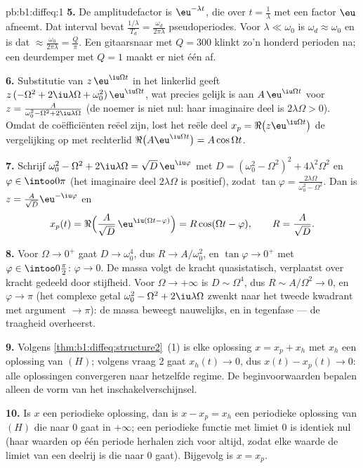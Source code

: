 \begin{solution}{pb:b1:diffeq:1}
\textbf{5.} De amplitudefactor is $\eu^{-\lambda t}$, die over $t =
\frac1\lambda$ met een factor $\eu$ afneemt. Dat interval bevat
$\frac{1/\lambda}{T_d} = \frac{\omega_d}{2\pi\lambda}$ pseudoperiodes.
Voor $\lambda \ll \omega_0$ is $\omega_d \approx \omega_0$ en is dat
$\approx \frac{\omega_0}{2\pi\lambda} = \frac Q\pi$. Een gitaarsnaar met
$Q = 300$ klinkt zo'n honderd perioden na; een deurdemper met $Q = 1$
maakt er niet één af.

\textbf{6.} Substitutie van $z\,\eu^{\iu\Omega t}$ in het linkerlid geeft
$z\,(-\Omega^2 + 2\iu\lambda\Omega + \omega_0^2)\,\eu^{\iu\Omega t}$, wat
precies gelijk is aan $A\,\eu^{\iu\Omega t}$ voor $z =
\frac{A}{\omega_0^2 - \Omega^2 + 2\iu\lambda\Omega}$ (de noemer is niet
nul: haar imaginaire deel is $2\lambda\Omega > 0$). Omdat de
coëfficiënten reëel zijn, lost het reële deel $x_p =
\Re\bigl(z\eu^{\iu\Omega t}\bigr)$ de vergelijking op met rechterlid
$\Re\bigl(A\eu^{\iu\Omega t}\bigr) = A\cos\Omega t$.

\textbf{7.} Schrijf $\omega_0^2 - \Omega^2 + 2\iu\lambda\Omega =
\sqrt{D}\,\eu^{\iu\varphi}$ met $D = (\omega_0^2 - \Omega^2)^2 +
4\lambda^2\Omega^2$ en $\varphi \in \intoo0\pi$ (het imaginaire deel
$2\lambda\Omega$ is positief), zodat $\tan\varphi =
\frac{2\lambda\Omega}{\omega_0^2 - \Omega^2}$. Dan is $z = \frac{A}{\sqrt
D}\eu^{-\iu\varphi}$ en
\[
x_p(t) = \Re\Bigl(\frac A{\sqrt D}\,\eu^{\iu(\Omega t -
\varphi)}\Bigr) = R\cos(\Omega t - \varphi),
\qquad R = \frac A{\sqrt D} .
\]

\textbf{8.} Voor $\Omega \to 0^+$ gaat $D \to \omega_0^4$, dus $R \to
A/\omega_0^2$, en $\tan\varphi \to 0^+$ met $\varphi \in
\intoo0{\frac\pi2}$: $\varphi \to 0$. De massa volgt de kracht
quasistatisch, verplaatst over kracht gedeeld door stijfheid. Voor
$\Omega \to +\infty$ is $D \sim \Omega^4$, dus $R \sim A/\Omega^2 \to 0$,
en $\varphi \to \pi$ (het complexe getal $\omega_0^2 - \Omega^2 +
2\iu\lambda\Omega$ zwenkt naar het tweede kwadrant met argument $\to
\pi$): de massa beweegt nauwelijks, en in tegenfase --- de traagheid
overheerst.

\textbf{9.} Volgens \cref{thm:b1:diffeq:structure2}~(1) is elke oplossing
$x = x_p + x_h$ met $x_h$ een oplossing van $(H)$; volgens vraag 2 gaat
$x_h(t) \to 0$, dus $x(t) - x_p(t) \to 0$: alle oplossingen convergeren
naar hetzelfde regime. De beginvoorwaarden bepalen alleen de vorm van het
inschakelverschijnsel.

\textbf{10.} Is $x$ een periodieke oplossing, dan is $x - x_p = x_h$ een
periodieke oplossing van $(H)$ die naar $0$ gaat in $+\infty$; een
periodieke functie met limiet $0$ is identiek nul (haar waarden op één
periode herhalen zich voor altijd, zodat elke waarde de limiet van een
deelrij is die naar $0$ gaat). Bijgevolg is $x = x_p$.


\end{solution}
